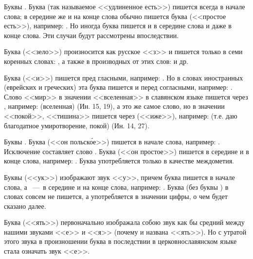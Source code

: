 \documentclass[11pt,a4paper,oneside]{memoir}
\begin{document}
Буквы {}. Буква {} (так называемое <<удлиненное есть>>) пишется всегда в начале слова; в середине же и на конце слова обычно пишется буква {} (<<простое есть>>), например: {}. Но иногда буква {} пишется и в середине слова и даже в конце слова. Эти случаи будут рассмотрены впоследствии.

Буква {} (<<зело>>) произносится как русское <<з>> и пишется только в семи коренных словах: {}, а также в производных от этих слов: {} и др.

Буква {} (<<и>>) пишется пред гласными, например: {}. Но в словах иностранных (еврейских и греческих) эта буква пишется и перед согласными, например: {}. Слово <<мир>> в значении <<вселенная>> в славянском языке пишется через {}, например: {} (вселенная) (Ин. 15, 19), а это же самое слово, но в значении <<покой>>, <<тишина>> пишется через {} (<<иже>>), например: {} (т.е. даю благодатное умиротворение, покой) (Ин. 14, 27).

Буквы {}. Буква {} (<<он польск\'ое>>) пишется в начале слова, например: {}. Исключение составляет слово {}. Буква {} (<<он простое>>) пишется в середине и в конце слова, например: {}. Буква {} употребляется только в качестве междометия.

Буквы {} (<<ук>>) изображают звук <<у>>, причем буква {} пишется в начале слова, а {}~---~в середине и на конце слова, например: {}. Буква {} (без буквы {}) в словах совсем не пишется, а употребляется в значении цифры, о чем будет сказано далее.

Буква {} (<<ять>>) первоначально изображала собою звук как бы средний между нашими звуками <<е>> и <<я>> (почему и названа <<ять>>). Но с утратой этого звука в произношении буква {} в последствии в церковнославянском языке стала означать звук <<е>>.
\end{document}
